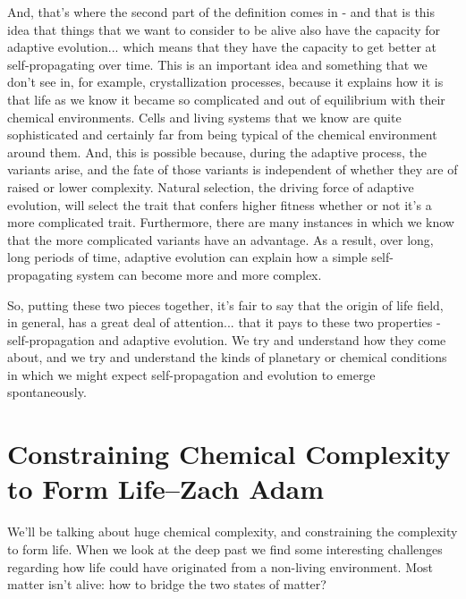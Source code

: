 \documentclass[]{article}
\begin{document}
And, that's where the second part
of the definition comes in -
and that is this idea that things
that we want to consider to be alive
also have the capacity
for adaptive evolution...
which means that
they have the capacity
to get better at
self-propagating over time.
This is an important idea
and something that we don't see in,
for example, crystallization processes,
because it explains
how it is that life as we know it
became so complicated
and out of equilibrium
with their chemical environments.
Cells and living systems that we know
are quite sophisticated
and certainly far from being typical of
the chemical environment around them.
And, this is possible because,
during the adaptive process,
the variants arise,
and the fate of those variants
is independent of whether they are
of raised or lower complexity.
Natural selection,
the driving force of adaptive evolution,
will select the trait that
confers higher fitness
whether or not
it's a more complicated trait.
Furthermore, there are many instances
in which we know
that the more complicated variants
have an advantage.
As a result,
over long, long periods of time,
adaptive evolution can explain
how a simple self-propagating system
can become more and more complex.

So, putting these
two pieces together,
it's fair to say that
the origin of life field,
in general, has a great deal
of attention...
that it pays to these two properties -
self-propagation and adaptive evolution.
We try and understand
how they come about,
and we try and understand the kinds
of planetary or chemical conditions
in which we might expect
self-propagation and evolution
to emerge spontaneously.



\section[Constraining Chemical Complexity to Form Life]{Constraining Chemical Complexity to Form Life--Zach Adam}

We'll be talking about huge chemical complexity, and constraining the complexity to form life. When we look at the deep past we find some interesting challenges regarding how life could have originated from a non-living environment. Most matter isn't alive: how to bridge the two states of matter?
\end{document}
